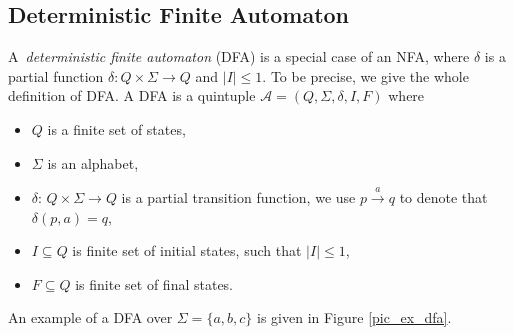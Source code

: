 	\subsection{Deterministic Finite Automaton}
	\label{defDFA}
  A~\emph{deterministic finite automaton} (DFA) is a special case of an NFA, where $\delta$ is a partial function 
$\delta: Q\times \Sigma \to Q$ and $|I| \leq 1$. To be precise, we give the whole definition of DFA.\newline
\newline
		A DFA is a quintuple $\mathcal{A}=(Q,\Sigma,\delta,I,F)$ where
		\begin{itemize}
			\item $Q$ is a finite set of states,
			\item $\Sigma$ is  an alphabet,
			\item $\delta$:  $Q \times \Sigma \to Q$ is a partial transition function, we use $p \xrightarrow{a} q$ to denote that $\delta(p,a)=q$,
			\item $I\subseteq Q$ is finite set of initial states, such that $|I| \leq 1$,
			\item $F\subseteq Q$ is finite set of final states.
		\end{itemize}
    An example of a DFA over $\Sigma=\{a,b,c\}$ is given in Figure \ref{pic_ex_dfa}.


